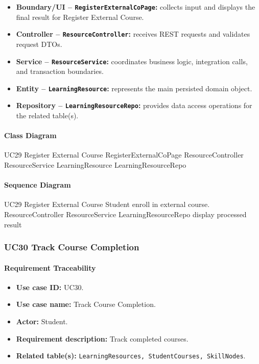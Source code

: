 \begin{itemize}
    \item \textbf{Boundary/UI -- \texttt{RegisterExternalCoPage}:} collects input and displays the final result for Register External Course.
    \item \textbf{Controller -- \texttt{ResourceController}:} receives REST requests and validates request DTOs.
    \item \textbf{Service -- \texttt{ResourceService}:} coordinates business logic, integration calls, and transaction boundaries.
    \item \textbf{Entity -- \texttt{LearningResource}:} represents the main persisted domain object.
    \item \textbf{Repository -- \texttt{LearningResourceRepo}:} provides data access operations for the related table(s).
\end{itemize}

\paragraph{Class Diagram}

\ClassDiagram
{UC29 Register External Course}
{RegisterExternalCoPage}
{ResourceController}
{ResourceService}
{LearningResource}
{LearningResourceRepo}

\paragraph{Sequence Diagram}

\SequenceDiagram
{UC29 Register External Course}
{Student}
{enroll in external course.}
{ResourceController}
{ResourceService}
{LearningResourceRepo}
{display processed result}

\subsubsection{UC30 Track Course Completion}

\paragraph{Requirement Traceability}

\begin{itemize}
    \item \textbf{Use case ID:} UC30.
    \item \textbf{Use case name:} Track Course Completion.
    \item \textbf{Actor:} Student.
    \item \textbf{Requirement description:} Track completed courses.
    \item \textbf{Related table(s):} \texttt{LearningResources, StudentCourses, SkillNodes}.
\end{itemize}

